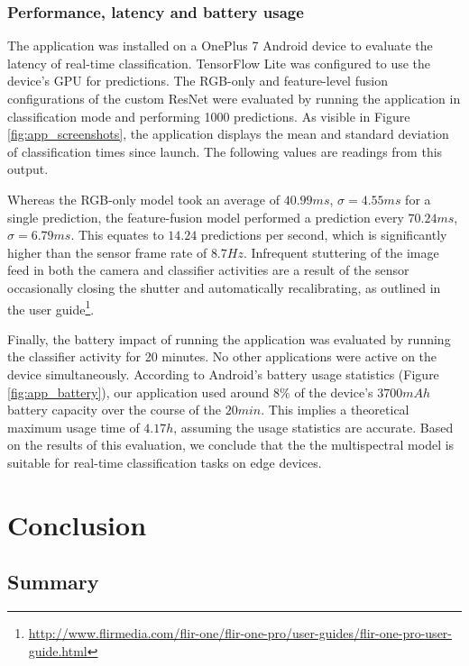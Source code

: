 \documentclass{l4proj}
\begin{document}
\subsection{Performance, latency and battery usage}

The application was installed on a OnePlus 7 Android device to evaluate the latency of real-time classification. TensorFlow Lite was configured to use the device's GPU for predictions. The RGB-only and feature-level fusion configurations of the custom ResNet were evaluated by running the application in classification mode and performing 1000 predictions. As visible in Figure \ref{fig:app_screenshots}, the application displays the mean and standard deviation of classification times since launch. The following values are readings from this output.

Whereas the RGB-only model took an average of $40.99 ms$, $\sigma = 4.55 ms$ for a single prediction, the feature-fusion model performed a prediction every $70.24 ms$, $\sigma = 6.79 ms$. This equates to $14.24$ predictions per second, which is significantly higher than the sensor frame rate of $8.7 Hz$. 
Infrequent stuttering of the image feed in both the camera and classifier activities are a result of the sensor occasionally closing the shutter and automatically recalibrating, as outlined in the user guide\footnote{\url{http://www.flirmedia.com/flir-one/flir-one-pro/user-guides/flir-one-pro-user-guide.html}}.

Finally, the battery impact of running the application was evaluated by running the classifier activity for 20 minutes. No other applications were active on the device simultaneously. According to Android's battery usage statistics (Figure \ref{fig:app_battery}), our application used around $8\%$ of the device's $3700 mAh$ battery capacity over the course of the $20 min$. This implies a theoretical maximum usage time of $4.17 h$, assuming the usage statistics are accurate. Based on the results of this evaluation, we conclude that the the multispectral model is suitable for real-time classification tasks on edge devices.

\chapter{Conclusion}

\section{Summary}
\end{document}
